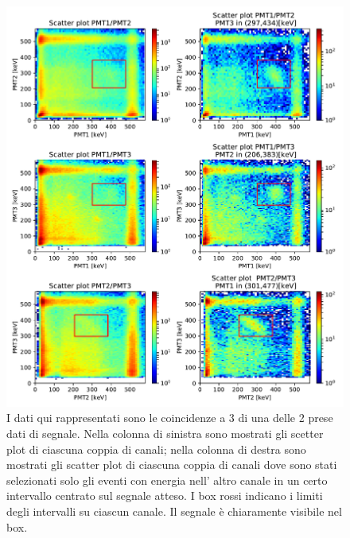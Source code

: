  \begin{figure}[h]
	\hspace{-4em}
	\includegraphics[width=44em]{immagini/3gamma_signal}
	\caption{\label{fig:3gamma_signal} I dati qui rappresentati sono le coincidenze a 3 di una delle 2 prese dati di segnale. Nella colonna di sinistra sono mostrati gli scetter plot di ciascuna coppia di canali; nella colonna di destra sono mostrati gli scatter plot di ciascuna coppia di canali dove sono stati selezionati solo gli eventi con energia nell' altro canale in un certo intervallo centrato sul segnale atteso. I box rossi indicano i limiti degli intervalli su ciascun canale. Il segnale è chiaramente visibile nel box.}
\end{figure}

